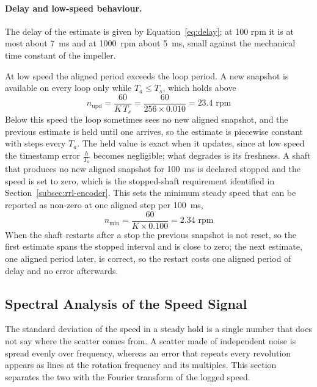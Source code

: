 \paragraph{Delay and low-speed behaviour.}
The delay of the estimate is given by Equation~\ref{eq:delay}; at 100 rpm it is at most about 7~ms and at 1000~rpm about 5~ms, small against the mechanical time constant of the impeller.

At low speed the aligned period exceeds the loop period. A new snapshot is available on every loop only while $T_a \leq T_s$, which holds above
\begin{equation}
    n_{\text{upd}} = \frac{60}{K \, T_s} = \frac{60}{256 \times 0.010} = 23.4 \text{ rpm}
    \label{eq:nupd}
\end{equation}
Below this speed the loop sometimes sees no new aligned snapshot, and the previous estimate is held until one arrives, so the estimate is piecewise constant with steps every $T_a$. The held value is exact when it updates, since at low speed the timestamp error $\frac{h}{T_a}$ becomes negligible; what degrades is its freshness. A shaft that produces no new aligned snapshot for 100~ms is declared stopped and the speed is set to zero, which is the stopped-shaft requirement identified in Section~\ref{subsec:rrl-encoder}. This sets the minimum steady speed that can be reported as non-zero at one aligned step per 100~ms,
\begin{equation}
    n_{\min} = \frac{60}{K \times 0.100} = 2.34 \text{ rpm}
    \label{eq:nmin}
\end{equation}
When the shaft restarts after a stop the previous snapshot is not reset, so the first estimate spans the stopped interval and is close to zero; the next estimate, one aligned period later, is correct, so the restart costs one aligned period of delay and no error afterwards.

\subsection{Spectral Analysis of the Speed Signal}
\label{subsec:agit-fft}

The standard deviation of the speed in a steady hold is a single number that does not say where the scatter comes from. A scatter made of independent noise is spread evenly over frequency, whereas an error that repeats every revolution appears as lines at the rotation frequency and its multiples. This section separates the two with the Fourier transform of the logged speed.

